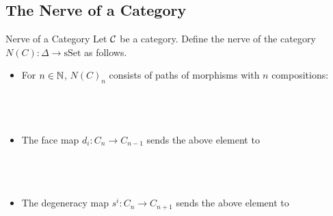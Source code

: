 \documentclass[a4paper]{article}
\begin{document}
\subsection{The Nerve of a Category}
\begin{defn}{Nerve of a Category}{} Let $\mathcal{C}$ be a category. Define the nerve of the category $N(C):\Delta\to\text{sSet}$ as follows. 
\begin{itemize}
\item For $n\in\mathbb{N}$, $N(C)_n$ consists of paths of morphisms with $n$ compositions: \\~\\
\\~\\
\item The face map $d_i:C_n\to C_{n-1}$ sends the above element to \\~\\
\\~\\
\item The degeneracy map $s^i:C_n\to C_{n+1}$ sends the above element to 
\end{itemize}
\end{defn}
\end{document}
